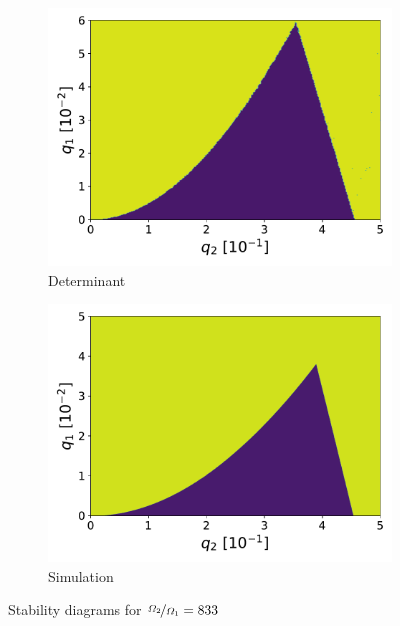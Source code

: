 \begin{figure}[H]
\begin{subfigure}{.5\textwidth}
  \centering
  \includegraphics[width=\linewidth]{img/det_q1_0.0-0.06_q2_0.0-0.5_300x300_833.pdf}
  \caption{Determinant}
  \label{fig:det_833}
\end{subfigure}%
\begin{subfigure}{.5\textwidth}
  \centering
  \includegraphics[width=\linewidth]{img/0_ions_1_electrons_q1_0.0-0.05_q2_0.0-0.5_960x960_833.pdf}  
  \caption{Simulation}
  \label{fig:sim_833}
\end{subfigure}
\caption{Stability diagrams for $\nicefrac{\Omega_2}{\Omega_1} = 833$}
\label{fig:stabil-eta=833}
\end{figure}


